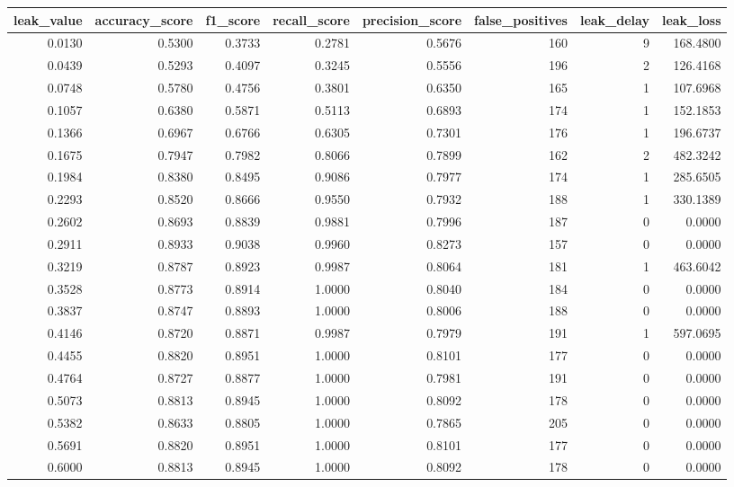 \begin{tabular}{rrrrrrrr}
\toprule
leak\_value & accuracy\_score & f1\_score & recall\_score & precision\_score & false\_positives & leak\_delay & leak\_loss \\
\midrule
0.0130 & 0.5300 & 0.3733 & 0.2781 & 0.5676 & 160 & 9 & 168.4800 \\
0.0439 & 0.5293 & 0.4097 & 0.3245 & 0.5556 & 196 & 2 & 126.4168 \\
0.0748 & 0.5780 & 0.4756 & 0.3801 & 0.6350 & 165 & 1 & 107.6968 \\
0.1057 & 0.6380 & 0.5871 & 0.5113 & 0.6893 & 174 & 1 & 152.1853 \\
0.1366 & 0.6967 & 0.6766 & 0.6305 & 0.7301 & 176 & 1 & 196.6737 \\
0.1675 & 0.7947 & 0.7982 & 0.8066 & 0.7899 & 162 & 2 & 482.3242 \\
0.1984 & 0.8380 & 0.8495 & 0.9086 & 0.7977 & 174 & 1 & 285.6505 \\
0.2293 & 0.8520 & 0.8666 & 0.9550 & 0.7932 & 188 & 1 & 330.1389 \\
0.2602 & 0.8693 & 0.8839 & 0.9881 & 0.7996 & 187 & 0 & 0.0000 \\
0.2911 & 0.8933 & 0.9038 & 0.9960 & 0.8273 & 157 & 0 & 0.0000 \\
0.3219 & 0.8787 & 0.8923 & 0.9987 & 0.8064 & 181 & 1 & 463.6042 \\
0.3528 & 0.8773 & 0.8914 & 1.0000 & 0.8040 & 184 & 0 & 0.0000 \\
0.3837 & 0.8747 & 0.8893 & 1.0000 & 0.8006 & 188 & 0 & 0.0000 \\
0.4146 & 0.8720 & 0.8871 & 0.9987 & 0.7979 & 191 & 1 & 597.0695 \\
0.4455 & 0.8820 & 0.8951 & 1.0000 & 0.8101 & 177 & 0 & 0.0000 \\
0.4764 & 0.8727 & 0.8877 & 1.0000 & 0.7981 & 191 & 0 & 0.0000 \\
0.5073 & 0.8813 & 0.8945 & 1.0000 & 0.8092 & 178 & 0 & 0.0000 \\
0.5382 & 0.8633 & 0.8805 & 1.0000 & 0.7865 & 205 & 0 & 0.0000 \\
0.5691 & 0.8820 & 0.8951 & 1.0000 & 0.8101 & 177 & 0 & 0.0000 \\
0.6000 & 0.8813 & 0.8945 & 1.0000 & 0.8092 & 178 & 0 & 0.0000 \\
\bottomrule
\end{tabular}
